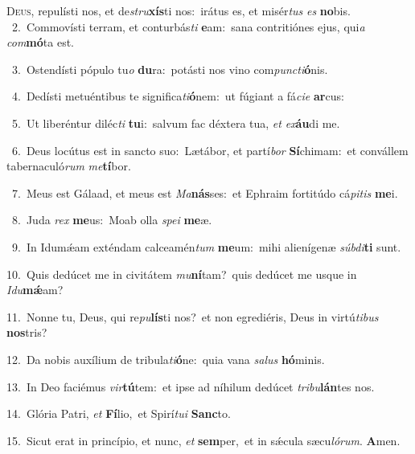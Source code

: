 \lettrine{\initial\textcolor{\initialcolor}{D}}{eus,} repulísti nos, et de\-\textit{stru}\-\textbf{xís}ti nos:~\star irátus es, et misér\textit{tus} \textit{es} \textbf{no}\-bis.\\
{\numbfont\textcolor{\numbcolor}{~2.}}~Commovísti terram, et conturbás\textit{ti} \textbf{e}\-am:~\star sana contritiónes ejus, qui\textit{a} \textit{com}\-\textbf{mó}ta est.\par
{\numbfont\textcolor{\numbcolor}{~3.}}~Ostendísti pópulo tu\textit{o} \textbf{du}\-ra:~\star potásti nos vino com\-\textit{punc}\-\textit{ti}\textbf{ó}nis.\par
{\numbfont\textcolor{\numbcolor}{~4.}}~Dedísti metuéntibus te significa\-\textit{ti}\-\textbf{ó}nem:~\star ut fúgiant a fá\-\textit{ci}\-\textit{e} \textbf{ar}\-cus:\par
{\numbfont\textcolor{\numbcolor}{~5.}}~Ut liberéntur diléc\textit{ti} \textbf{tu}\-i:~\star salvum fac déxtera tua, \textit{et} \textit{ex}\-\textbf{áu}di me.\par
{\numbfont\textcolor{\numbcolor}{~6.}}~Deus locútus est in sancto suo:~\dagger Lætábor, et partí\textit{bor} \textbf{Sí}\-chimam:~\star et convállem tabernaculó\textit{rum} \textit{me}\-\textbf{tí}bor.\par
{\numbfont\textcolor{\numbcolor}{~7.}}~Meus est Gálaad, et meus est \textit{Ma}\-\textbf{nás}ses:~\star et Ephraim fortitúdo cá\-\textit{pi}\-\textit{tis} \textbf{me}\-i.\par
{\numbfont\textcolor{\numbcolor}{~8.}}~Juda \textit{rex} \textbf{me}\-us:~\star Moab olla \textit{spe}\-\textit{i} \textbf{me}\-æ.\par
{\numbfont\textcolor{\numbcolor}{~9.}}~In Idumǽam exténdam calceamén\textit{tum} \textbf{me}\-um:~\star mihi alienígenæ \textit{súb}\-\textit{di}\textbf{ti} sunt.\par
{\numbfont\textcolor{\numbcolor}{10.}}~Quis dedúcet me in civitátem \textit{mu}\-\textbf{ní}tam?~\star quis dedúcet me usque in \textit{I}\-\textit{du}\textbf{mǽ}am?\par
{\numbfont\textcolor{\numbcolor}{11.}}~Nonne tu, Deus, qui re\-\textit{pu}\-\textbf{lís}ti nos?~\star et non egrediéris, Deus in virtú\-\textit{ti}\-\textit{bus} \textbf{nos}\-tris?\par
{\numbfont\textcolor{\numbcolor}{12.}}~Da nobis auxílium de tribula\-\textit{ti}\-\textbf{ó}ne:~\star quia vana \textit{sa}\-\textit{lus} \textbf{hó}\-minis.\par
{\numbfont\textcolor{\numbcolor}{13.}}~In Deo faciémus \textit{vir}\-\textbf{tú}tem:~\star et ipse ad níhilum dedúcet \textit{tri}\-\textit{bu}\textbf{lán}tes nos.\par
{\numbfont\textcolor{\numbcolor}{14.}}~Glória Patri, \textit{et} \textbf{Fí}\-lio,~\star et Spirí\-\textit{tu}\-\textit{i} \textbf{Sanc}\-to.\par
{\numbfont\textcolor{\numbcolor}{15.}}~Sicut erat in princípio, et nunc, \textit{et} \textbf{sem}\-per,~\star et in sǽcula sæcu\-\textit{ló}\-\textit{rum}. \textbf{A}\-men.\par
